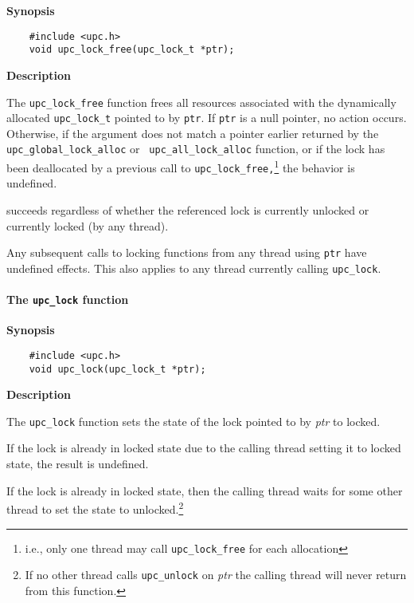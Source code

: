 {\bf Synopsis} 

\npf\vspace{-2.5em}
\begin{verbatim}
    #include <upc.h> 
    void upc_lock_free(upc_lock_t *ptr); 
\end{verbatim}

{\bf Description}

\np The {\tt upc\_lock\_free} function frees all resources
    associated with the dynamically allocated {\tt upc\_lock\_t} pointed to
    by {\tt ptr}.  If {\tt ptr} is a null pointer, no action occurs.
    Otherwise, if the argument does not match a pointer earlier
    returned by the {\tt upc\_global\_lock\_alloc} or {\tt
    upc\_all\_lock\_alloc} function, or if the lock has been
    deallocated by a previous call to {\tt upc\_lock\_free,}\footnote
    {i.e., only one thread may call {\tt upc\_lock\_free} for each
    allocation} the behavior is undefined.

 succeeds regardless of whether the
    referenced lock is currently unlocked or currently locked (by any
    thread).

\np Any subsequent calls to locking functions from any
    thread using {\tt ptr} have undefined effects. This also
    applies to any thread currently calling {\tt upc\_lock}.

\paragraph{The {\tt upc\_lock} function}

{\bf Synopsis} 

\npf\vspace{-2.5em}
\begin{verbatim}
    #include <upc.h> 
    void upc_lock(upc_lock_t *ptr); 
\end{verbatim}

{\bf Description}

\np The {\tt upc\_lock} function sets the state of the lock
    pointed to by {\em ptr} to locked.

\np If the lock is already in locked state due to the calling thread setting it
    to locked state, the result is undefined.

\np If the lock is already in locked state, then the calling
    thread waits for some other thread to set the state to 
    unlocked.\footnote{If no other thread calls {\tt upc\_unlock} on {\em ptr}
    the calling thread will never return from this function.}

